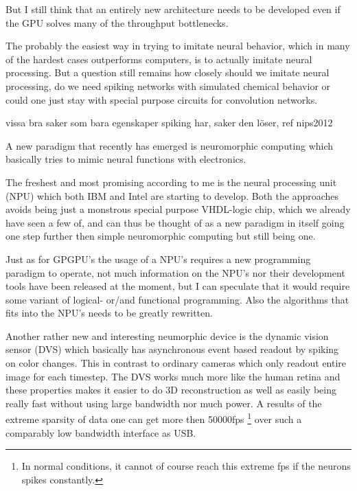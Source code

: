 \documentclass{article}
\begin{document}
    But I still think that an entirely new architecture needs to be developed 
    even if the GPU solves many of the throughput bottlenecks.
    
    The probably the easiest way in trying to imitate neural behavior, 
    which in many of the hardest cases outperforms computers, is to actually
    imitate neural processing. But a question still remains how closely should
    we imitate neural processing, do we need spiking networks with simulated
    chemical behavior or could one just stay with special purpose circuits 
    for convolution networks.

    vissa bra saker som bara egenskaper spiking har, saker den löser, ref nips2012

    A new paradigm that recently has emerged is neuromorphic
    computing which basically tries to mimic neural functions with electronics.
    
    The freshest and most promising according to me is the 
    neural processing unit (NPU) which both IBM\cite{synapse} and
    Intel\cite{intelneuro} are starting to develop. Both the approaches avoids being
    just a monstrous special purpose VHDL-logic chip, which we already have
    seen a few of, and can thus be thought of
    as a new paradigm in itself going one step further then simple neuromorphic
    computing but still being one.

    Just as for GPGPU's the usage of a NPU's requires a new programming paradigm to
    operate, not much information on the NPU's nor their development tools
    have been released at the moment, but I can speculate that it would
    require some variant of logical- or/and functional programming. 
    Also the algorithms that fits into the
    NPU's needs to be greatly rewritten.
    
    Another rather new and interesting neumorphic device is the
    dynamic vision sensor (DVS) which basically has asynchronous event based
    readout by spiking on color changes.\cite{dvs} This in contrast to ordinary
    cameras which only readout entire image for each timestep. 
    The DVS works much more like the human retina and
    these properties makes it easier to do 3D reconstruction as well as easily
    being really fast without using large bandwidth nor much power. A results
    of the extreme sparsity of data one can get more then 50000fps
    \footnote{In normal conditions, it cannot of course reach this extreme fps
    if the neurons spikes constantly.}
    over such a comparably low bandwidth interface as USB.
\end{document}
